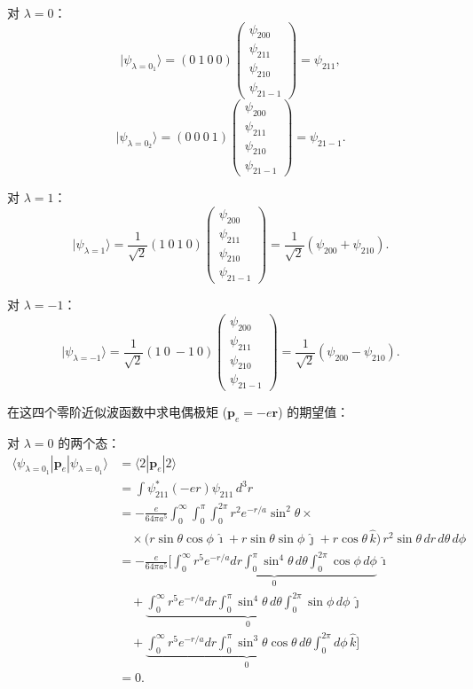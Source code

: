 对 $\lambda = 0$：
\[
|\psi_{\lambda=0_1}\rangle = (0\ 1\ 0\ 0) \begin{pmatrix} \psi_{200} \\ \psi_{211} \\ \psi_{210} \\ \psi_{21-1} \end{pmatrix} = \psi_{211},
\]
\[
|\psi_{\lambda=0_2}\rangle = (0\ 0\ 0\ 1) \begin{pmatrix} \psi_{200} \\ \psi_{211} \\ \psi_{210} \\ \psi_{21-1} \end{pmatrix} = \psi_{21-1}.
\]

对 $\lambda = 1$：
\[
|\psi_{\lambda=1}\rangle = \frac{1}{\sqrt{2}} (1\ 0\ 1\ 0) \begin{pmatrix} \psi_{200} \\ \psi_{211} \\ \psi_{210} \\ \psi_{21-1} \end{pmatrix} = \frac{1}{\sqrt{2}} (\psi_{200} + \psi_{210}).
\]

对 $\lambda = -1$：
\[
|\psi_{\lambda=-1}\rangle = \frac{1}{\sqrt{2}} (1\ 0\ -1\ 0) \begin{pmatrix} \psi_{200} \\ \psi_{211} \\ \psi_{210} \\ \psi_{21-1} \end{pmatrix} = \frac{1}{\sqrt{2}} (\psi_{200} - \psi_{210}).
\]

在这四个零阶近似波函数中求电偶极矩 ($\mathbf{p}_e = -e\mathbf{r}$) 的期望值：

对 $\lambda = 0$ 的两个态：
\begin{align*}
	\langle \psi_{\lambda=0_1} | \mathbf{p}_e | \psi_{\lambda=0_1} \rangle 
	&= \langle 2 | \mathbf{p}_e | 2 \rangle \\
	&= \int \psi_{211}^*(-er)\psi_{211} \, d^3r \\
	&= -\frac{e}{64\pi a^5} \int_0^\infty \int_0^\pi \int_0^{2\pi} 
	r^2 e^{-r/a} \sin^2\theta \times \\
	&\quad \times \bigl( r\sin\theta\cos\phi\,\hat{\imath} 
	+ r\sin\theta\sin\phi\,\hat{\jmath} 
	+ r\cos\theta\,\hat{k} \bigr) \, r^2 \sin\theta 
	\, dr\,d\theta\,d\phi \\
	&= -\frac{e}{64\pi a^5} \biggl[ 
	\underbrace{\int_0^\infty r^5 e^{-r/a} dr 
		\int_0^\pi \sin^4\theta\,d\theta 
		\int_0^{2\pi} \cos\phi\,d\phi}_{0} \,\hat{\imath} \\
	&\quad + \underbrace{\int_0^\infty r^5 e^{-r/a} dr 
		\int_0^\pi \sin^4\theta\,d\theta 
		\int_0^{2\pi} \sin\phi\,d\phi}_{0} \,\hat{\jmath} \\
	&\quad + \underbrace{\int_0^\infty r^5 e^{-r/a} dr 
		\int_0^\pi \sin^3\theta\cos\theta\,d\theta 
		\int_0^{2\pi} d\phi}_{0} \,\hat{k} \biggr] \\
	&= 0.
\end{align*}


